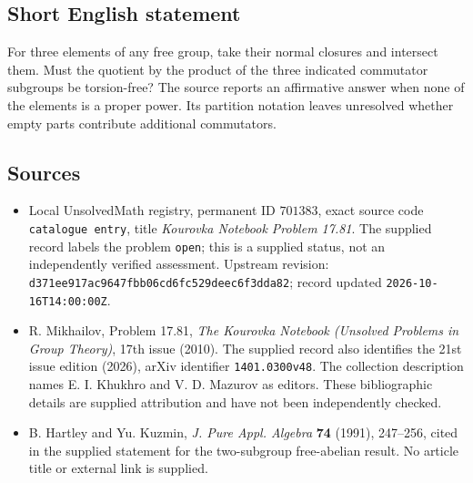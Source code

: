 \documentclass[11pt]{article}
\begin{document}
\subsection{Short English statement}
For three elements of any free group, take their normal closures and intersect them. Must the quotient by the product of the three indicated commutator subgroups be torsion-free? The source reports an affirmative answer when none of the elements is a proper power. Its partition notation leaves unresolved whether empty parts contribute additional commutators.
\subsection{Sources}
\begin{itemize}
\item Local UnsolvedMath registry, permanent ID \(701383\), exact source code \texttt{catalogue entry}, title \emph{Kourovka Notebook Problem 17.81}. The supplied record labels the problem \texttt{open}; this is a supplied status, not an independently verified assessment. Upstream revision: \texttt{d371ee917ac9647fbb06cd6fc529deec6f3dda82}; record updated \texttt{2026-10-16T14:00:00Z}.
\item R. Mikhailov, Problem 17.81, \emph{The Kourovka Notebook (Unsolved Problems in Group Theory)}, 17th issue (2010). The supplied record also identifies the 21st issue edition (2026), arXiv identifier \texttt{1401.0300v48}. The collection description names E. I. Khukhro and V. D. Mazurov as editors. These bibliographic details are supplied attribution and have not been independently checked.
\item B. Hartley and Yu. Kuzmin, \emph{J. Pure Appl. Algebra} \textbf{74} (1991), 247--256, cited in the supplied statement for the two-subgroup free-abelian result. No article title or external link is supplied.
\end{itemize}
\end{document}
